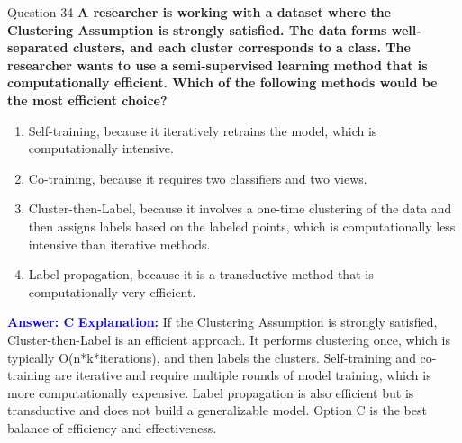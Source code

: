 \documentclass{beamer}
\begin{document}
	\begin{frame}{Question 34}
		\textbf{A researcher is working with a dataset where the Clustering Assumption is strongly satisfied. The data forms well-separated clusters, and each cluster corresponds to a class. The researcher wants to use a semi-supervised learning method that is computationally efficient. Which of the following methods would be the most efficient choice?}
		\begin{enumerate}
			\item Self-training, because it iteratively retrains the model, which is computationally intensive.
			\item Co-training, because it requires two classifiers and two views.
			\item Cluster-then-Label, because it involves a one-time clustering of the data and then assigns labels based on the labeled points, which is computationally less intensive than iterative methods.
			\item Label propagation, because it is a transductive method that is computationally very efficient.
		\end{enumerate}
		\vspace{0.2cm}
		\textcolor{blue}{\textbf{Answer: C}}
		\vspace{0.2cm}
		\textcolor{blue}{\textbf{Explanation:}} If the Clustering Assumption is strongly satisfied, Cluster-then-Label is an efficient approach. It performs clustering once, which is typically O(n*k*iterations), and then labels the clusters. Self-training and co-training are iterative and require multiple rounds of model training, which is more computationally expensive. Label propagation is also efficient but is transductive and does not build a generalizable model. Option C is the best balance of efficiency and effectiveness.
	\end{frame}
	
\end{document}
